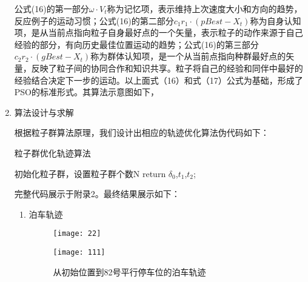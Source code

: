 \documentclass{MathorCupmodeling}
\begin{document}
\begin{enumerate}
		公式(16)的第一部分$\omega\cdot V_t$称为记忆项，表示维持上次速度大小和方向的趋势，反应例子的运动习惯；公式(16)的第二部分$c_1r_1\cdot(pBest-X_t)$称为自身认知项，是从当前点指向粒子自身最好点的一个矢量，表示粒子的动作来源于自己经验的部分，有向历史最佳位置运动的趋势；公式(16)的第三部分$c_2r_2\cdot(gBest-X_t)$称为群体认知项，是一个从当前点指向种群最好点的矢量，反映了粒子间的协同合作和知识共享。粒子将自己的经验和同伴中最好的经验结合决定下一步的运动。以上面式（16）和式（17）公式为基础，形成了PSO的标准形式。其算法示意图如下，
		\item 算法设计与求解
		
		根据粒子群算法原理，我们设计出相应的轨迹优化算法伪代码如下：
		
		\begin{algorithm}
			  \caption{粒子群优化轨迹算法}
			初始化粒子群，设置粒子群个数N
			return $\delta_0$,$t_1$,$t_2$;
		\end{algorithm}
		  
		完整代码展示于附录2。最终结果展示如下：
		  \begin{enumerate}
			  \item 泊车轨迹
			  

			\begin{figure}[H]
				\centering
				\begin{minipage}[c]{0.4\textwidth}
					\centering
					\texttt{[image: 22]}
					\label{fig:sample-figure-a}
				\end{minipage}
				\begin{minipage}[c]{0.4\textwidth}
					\centering
					\texttt{[image: 111]}
					\label{fig:sample-figure-c}
				\end{minipage}
				\caption{从初始位置到82号平行停车位的泊车轨迹}
				\label{fig:sample-figure}
			\end{figure}


\end{enumerate}
\end{enumerate}
\end{document}
